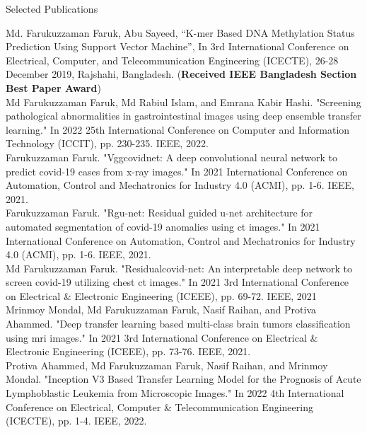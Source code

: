 \documentclass[a4paper,10pt]{article}
\newlength{\cvcolumngapwidth}
\newlength{\cvleftcolumnwidth}
\newlength{\cvrightcolumnwidth}
\newcommand{\cvheadingstyle}[1]{{\normalsize\cvheadingfont\textcolor{cvheadingcolor}{#1}}}
\newlength{\cvafteritemskipamount}
\newlength{\cvparskip}
\newcommand{\cvitem}[2]{
    \begin{minipage}[t]{\cvleftcolumnwidth}
        \raggedleft #1
    \end{minipage}%
    \hspace{\cvcolumngapwidth}%
    \begin{minipage}[t]{\cvrightcolumnwidth}
        \setlength{\parskip}{\cvparskip} #2
    \end{minipage}

    \vspace{\cvafteritemskipamount}
}
\begin{document}
\cvitem{
    \cvheadingstyle{Selected Publications}
} {
   Md. Farukuzzaman Faruk, Abu Sayeed, “K-mer Based DNA Methylation Status Prediction Using Support Vector Machine”, In 3rd International Conference on Electrical, Computer, and Telecommunication Engineering (ICECTE), 26-28 December 2019, Rajshahi, Bangladesh. (\textbf{Received IEEE Bangladesh Section Best Paper Award})
\vspace{2mm}\\
Md Farukuzzaman Faruk, Md Rabiul Islam, and Emrana Kabir Hashi. "Screening pathological abnormalities in gastrointestinal images using deep ensemble transfer learning." In 2022 25th International Conference on Computer and Information Technology (ICCIT), pp. 230-235. IEEE, 2022.
\vspace{2mm}\\
  Farukuzzaman Faruk. "Vggcovidnet: A deep convolutional neural network to predict covid-19 cases from x-ray images." In 2021 International Conference on Automation, Control and Mechatronics for Industry 4.0 (ACMI), pp. 1-6. IEEE, 2021.
\vspace{2mm}\\
Farukuzzaman  Faruk. "Rgu-net: Residual guided u-net architecture for automated segmentation of covid-19 anomalies using ct images." In 2021 International Conference on Automation, Control and Mechatronics for Industry 4.0 (ACMI), pp. 1-6. IEEE, 2021.
\vspace{2mm}\\
Md Farukuzzaman  Faruk. "Residualcovid-net: An interpretable deep network to screen covid-19 utilizing chest ct images." In 2021 3rd International Conference on Electrical & Electronic Engineering (ICEEE), pp. 69-72. IEEE, 2021
\vspace{2mm}\\
 Mrinmoy Mondal, Md Farukuzzaman Faruk, Nasif Raihan, and Protiva Ahammed. "Deep transfer learning based multi-class brain tumors classification using mri images." In 2021 3rd International Conference on Electrical & Electronic Engineering (ICEEE), pp. 73-76. IEEE, 2021.
 \vspace{2mm}\\
 Protiva Ahammed, Md Farukuzzaman Faruk, Nasif Raihan, and Mrinmoy Mondal. "Inception V3 Based Transfer Learning Model for the Prognosis of Acute Lymphoblastic Leukemia from Microscopic Images." In 2022 4th International Conference on Electrical, Computer & Telecommunication Engineering (ICECTE), pp. 1-4. IEEE, 2022.
\vspace{2mm}\\
}
\end{document}
